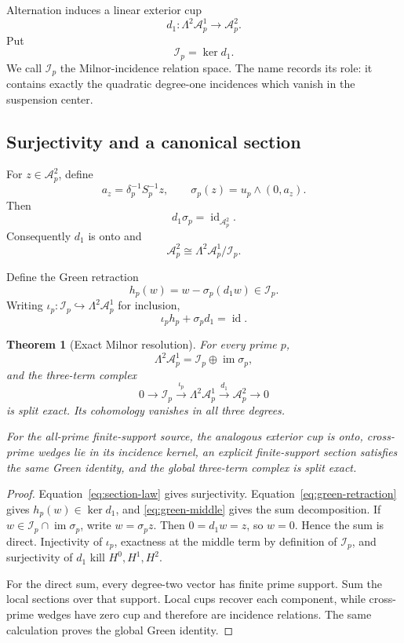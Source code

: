 \documentclass[11pt]{article}
\newtheorem{theorem}{Theorem}[section]
\theoremstyle{definition}
\theoremstyle{remark}
\newcommand{\cA}{\mathcal A}
\newcommand{\cI}{\mathcal I}
\newcommand{\im}{\operatorname{im}}
\newcommand{\id}{\operatorname{id}}
\begin{document}
Alternation induces a linear exterior cup
\[
                 d_1:\Lambda^2\cA_p^1\longrightarrow\cA_p^2.
\tag{3.1}\label{eq:exterior-cup}
\]
Put
\[
                           \cI_p=\ker d_1.
\tag{3.2}\label{eq:incidence}
\]
We call \(\cI_p\) the Milnor-incidence relation space.  The name records
its role: it contains exactly the quadratic degree-one incidences which
vanish in the suspension center.

\subsection{Surjectivity and a canonical section}

For \(z\in\cA_p^2\), define
\[
 a_z=\delta_p^{-1}S_p^{-1}z,\qquad
 \sigma_p(z)=u_p\wedge(0,a_z).
\tag{3.3}\label{eq:cup-section}
\]
Then
\[
                              d_1\sigma_p=\id_{\cA_p^2}.
\tag{3.4}\label{eq:section-law}
\]
Consequently \(d_1\) is onto and
\[
             \cA_p^2\cong\Lambda^2\cA_p^1/\cI_p.
\tag{3.5}\label{eq:milnor-quotient}
\]

Define the Green retraction
\[
      h_p(w)=w-\sigma_p(d_1w)\in\cI_p.
\tag{3.6}\label{eq:green-retraction}
\]
Writing \(\iota_p:\cI_p\hookrightarrow\Lambda^2\cA_p^1\) for inclusion,
\[
                   \iota_ph_p+\sigma_pd_1=\id.
\tag{3.7}\label{eq:green-middle}
\]

\begin{theorem}[Exact Milnor resolution]
\label{thm:milnor-resolution}
For every prime \(p\),
\[
  \Lambda^2\cA_p^1
     =\cI_p\oplus\im\sigma_p,
\tag{3.8}\label{eq:milnor-splitting}
\]
and the three-term complex
\[
   0\longrightarrow\cI_p
     \xrightarrow{\ \iota_p\ }
     \Lambda^2\cA_p^1
     \xrightarrow{\ d_1\ }
     \cA_p^2
     \longrightarrow0
\tag{3.9}\label{eq:milnor-complex}
\]
is split exact.  Its cohomology vanishes in all three degrees.

For the all-prime finite-support source, the analogous exterior cup is
onto, cross-prime wedges lie in its incidence kernel, an explicit
finite-support section satisfies the same Green identity, and the global
three-term complex is split exact.
\end{theorem}

\begin{proof}
Equation~\eqref{eq:section-law} gives surjectivity.
Equation~\eqref{eq:green-retraction} gives \(h_p(w)\in\ker d_1\), and
\eqref{eq:green-middle} gives the sum decomposition.  If
\(w\in\cI_p\cap\im\sigma_p\), write \(w=\sigma_pz\).  Then
\(0=d_1w=z\), so \(w=0\).  Hence the sum is direct.
Injectivity of \(\iota_p\), exactness at the middle term by definition of
\(\cI_p\), and surjectivity of \(d_1\) kill \(H^0,H^1,H^2\).

For the direct sum, every degree-two vector has finite prime support.  Sum
the local sections over that support.  Local cups recover each component,
while cross-prime wedges have zero cup and therefore are incidence
relations.  The same calculation proves the global Green identity.
\end{proof}
\end{document}
